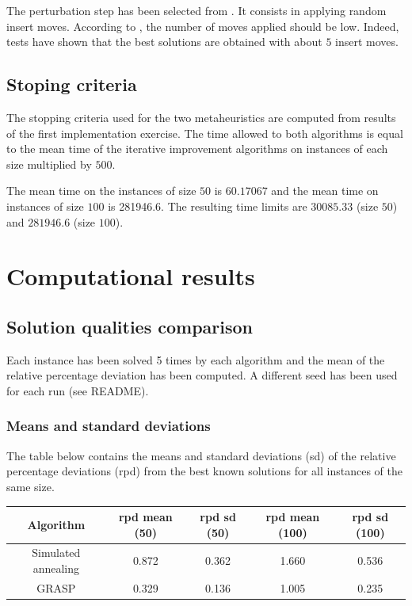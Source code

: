 \documentclass{article}
\begin{document}
The perturbation step has been selected from \cite{ref}.
It consists in applying random insert moves.
According to \cite{ref}, the number of moves applied should be low.
Indeed, tests have shown that the best solutions are obtained with about $5$ insert moves.

\subsection{Stoping criteria}

The stopping criteria used for the two metaheuristics are computed from results of the first implementation exercise.
The time allowed to both algorithms is equal to the mean time of the iterative improvement algorithms on instances of each size multiplied by $500$.\newline

The mean time on the instances of size $50$ is $60.17067$ and the mean time on instances of size $100$ is 281946.6.
The resulting time limits are $30085.33$ (size $50$) and $281946.6$ (size $100$).


\section{Computational results}

\subsection{Solution qualities comparison}

Each instance has been solved 5 times by each algorithm and the mean of the relative percentage deviation has been computed.
A different seed has been used for each run (see README).

\subsubsection{Means and standard deviations}

The table below contains the means and standard deviations (sd) of the relative percentage deviations (rpd) from the best known solutions for all instances of the same size.\newline

\begin{tabular} {|c|c|c|c|c|}
    \hline
    Algorithm & rpd mean (50) & rpd sd (50) & rpd mean (100) & rpd sd (100) \\
    \hline
    Simulated annealing & 0.872 & 0.362 & 1.660 & 0.536 \\
    \hline
    GRASP & 0.329 & 0.136 & 1.005 & 0.235 \\
    \hline
\end{tabular}
\end{document}
